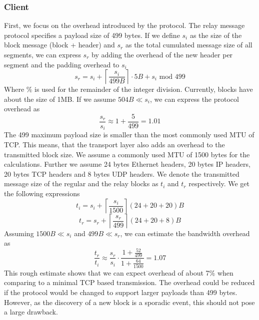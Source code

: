 \subsubsection{Client}
First, we focus on the overhead introduced by the protocol. The relay message protocol specifies a payload size of 499 bytes. If we define $s_i$ as the size of the block message (block + header) and $s_r$ as the total cumulated message size of all segments, we can express $s_r$ by adding the overhead of the new header per segment and the padding overhead to $s_i$
\begin{equation}
	s_r = s_i+ \left\lceil \frac{s_i}{499B} \right\rceil \cdot 5B + s_i \mbox{ mod } 499
\end{equation}
Where $\%$ is used for the remainder of the integer division. Currently, blocks have about the size of 1MB. If we assume $504B \ll s_i$, we can express the protocol overhead as  
\begin{equation} \label{eq:overhead}
	\frac{s_r}{s_i} \approx 1+\frac{5}{499} = 1.01
\end{equation}
The 499 maximum payload size is smaller than the most commonly used MTU of TCP. This means, that the transport layer also adds an overhead to the transmitted block size. We assume a commonly used MTU of 1500 bytes for the calculations. Further we assume 24 bytes Ethernet headers, 20 bytes IP headers, 20 bytes TCP headers and 8 bytes UDP headers. We denote the transmitted message size of the regular and the relay blocks as $t_i$ and $t_r$ respectively. We get the following expressions
\begin{equation}
	t_i = s_i + \left\lceil \frac{s_i}{1500} \right\rceil(24 + 20 + 20)B
\end{equation} 
\begin{equation}
	t_r = s_r + \left\lceil \frac{s_r}{499} \right\rceil(24 + 20 + 8)B
\end{equation} 
Assuming $1500B \ll s_i$ and $499B \ll s_r$, we can estimate the bandwidth overhead as
\begin{equation} \label{eq:throughput}
	\frac{t_r}{t_i}\approx \frac{s_r}{s_i} \cdot\frac{1+\frac{52}{499}}{1+\frac{64}{1500}} = 1.07
\end{equation}
This rough estimate shows that we can expect overhead of about 7\% when comparing to a minimal TCP based transmission. The overhead could be reduced if the protocol would be changed to support larger payloads than 499 bytes. However, as the discovery of a new block is a sporadic event, this should not pose a large drawback.\\
